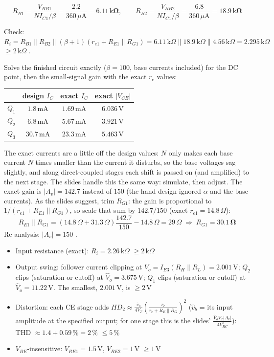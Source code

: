 \documentclass[11pt]{article}
\newcommand{\solstep}[2]{\par\medskip{\color{stepc}\textbf{Step #1 --- #2}}\par\nopagebreak}
\begin{document}
\[R_{B1} = \frac{V_{RB1}}{N I_{C1}/\beta} = \frac{2.2}{360\,\mu \mathrm{A}} = \mathbf{6.11\,\mathrm{k}\Omega},\qquad R_{B2} = \frac{V_{RB2}}{N I_{C1}/\beta} = \frac{6.8}{360\,\mu \mathrm{A}} = \mathbf{18.9\,\mathrm{k}\Omega}\]

Check: $R_i = R_{B1}\|R_{B2}\|(\beta+1)(r_{e1} + R_{E1}\|R_{G1}) = 6.11\,\mathrm{k}\Omega\|18.9\,\mathrm{k}\Omega\|4.56\,\mathrm{k}\Omega = 2.295\,\mathrm{k}\Omega$ $\ge 2\,\mathrm{k}\Omega$ \checkmark.
\solstep{5}{Check by analysis}Solve the finished circuit exactly ($\beta=100$, base currents included) for the DC point, then the small-signal gain with the exact $r_e$ values:\begin{center}\renewcommand{\arraystretch}{1.35}
\begin{tabular}{cccc}
\toprule
 & design $I_C$ & exact $I_C$ & exact $|V_{CE}|$ \\
\midrule
$Q_{1}$ & $1.8\,\mathrm{m}\mathrm{A}$ & $1.69\,\mathrm{m}\mathrm{A}$ & $6.036\,\mathrm{V}$ \\
$Q_{2}$ & $6.8\,\mathrm{m}\mathrm{A}$ & $5.67\,\mathrm{m}\mathrm{A}$ & $3.921\,\mathrm{V}$ \\
$Q_{3}$ & $30.7\,\mathrm{m}\mathrm{A}$ & $23.3\,\mathrm{m}\mathrm{A}$ & $5.463\,\mathrm{V}$ \\
\bottomrule
\end{tabular}\end{center}
The exact currents are a little off the design values: $N$ only makes each base current $N$ times smaller than the current it disturbs, so the base voltages sag slightly, and along direct-coupled stages each shift is passed on (and amplified) to the next stage. The slides handle this the same way: simulate, then adjust. The exact gain is $|A_v| = 142.7$ instead of $150$ (the hand design ignored $\alpha$ and the base currents). As the slides suggest, trim $R_{G1}$: the gain is proportional to $1/(r_{e1} + R_{E1}\|R_{G1})$, so scale that sum by $142.7/150$ (exact $r_{e1} = 14.8\,\Omega$):\[R_{E1}\|R_{G1} = (14.8\,\Omega + 31.3\,\Omega)\frac{142.7}{150} - 14.8\,\Omega = 29\,\Omega \;\Rightarrow\; R_{G1} = \mathbf{30.1\,\Omega}\]Re-analysis: $|A_v| = 150$ \checkmark. \begin{itemize}[leftmargin=*,itemsep=2pt]
\item Input resistance (exact): $R_i = 2.26\,\mathrm{k}\Omega$ $\ge 2\,\mathrm{k}\Omega$ \checkmark
\item Output swing: follower current clipping at $\hat V_o = I_{E3}(R_H\|R_L) = 2.001\,\mathrm{V}$; $Q_{2}$ clips (saturation or cutoff) at $\hat V_o = 3.675\,\mathrm{V}$; $Q_{1}$ clips (saturation or cutoff) at $\hat V_o = 11.22\,\mathrm{V}$. The smallest, $2.001\,\mathrm{V}$, is $\ge 2$\,V \checkmark
\item Distortion: each CE stage adds $HD_2 \approx \frac{\hat v_b}{4V_T}\left(\frac{r_e}{r_e + R_E\|R_G}\right)^2$ ($\hat v_b$ = its input amplitude at the specified output; for one stage this is the slides' $\frac{\hat V_o V_T |A_v|}{4V_{RC}^2}$): THD $\approx 1.4 + 0.59\,\% = 2\,\%$ $\le 5\,\%$ \checkmark
\item $V_{BE}$-insensitive: $V_{RE1} = 1.5$\,V, $V_{RE2} = 1$\,V $\ge 1$\,V \checkmark
\end{itemize}
\end{document}
